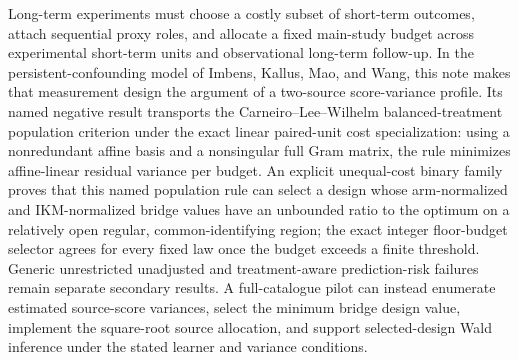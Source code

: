Long-term experiments must choose a costly subset of short-term outcomes, attach sequential proxy roles, and allocate a fixed main-study budget across experimental short-term units and observational long-term follow-up. In the persistent-confounding model of Imbens, Kallus, Mao, and Wang, this note makes that measurement design the argument of a two-source score-variance profile. Its named negative result transports the Carneiro--Lee--Wilhelm balanced-treatment population criterion under the exact linear paired-unit cost specialization: using a nonredundant affine basis and a nonsingular full Gram matrix, the rule minimizes affine-linear residual variance per budget. An explicit unequal-cost binary family proves that this named population rule can select a design whose arm-normalized and IKM-normalized bridge values have an unbounded ratio to the optimum on a relatively open regular, common-identifying region; the exact integer floor-budget selector agrees for every fixed law once the budget exceeds a finite threshold. Generic unrestricted unadjusted and treatment-aware prediction-risk failures remain separate secondary results. A full-catalogue pilot can instead enumerate estimated source-score variances, select the minimum bridge design value, implement the square-root source allocation, and support selected-design Wald inference under the stated learner and variance conditions.